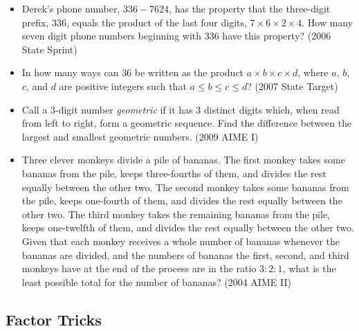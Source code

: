 \documentclass{article}
\begin{document}
\begin{itemize}
\item Derek's phone number, $336-7624$, has the property that the three-digit prefix, $336$, equals the product of the last four digits, $7\times 6\times 2\times 4$. How many seven digit phone numbers beginning with $336$ have this property? (2006 State Sprint)

\item In how many ways can $36$ be written as the product  $a\times b\times c\times d$, where $a$, $b$, $c$, and $d$ are positive integers such that $a\le b\le c\le d$? (2007 State Target)

\item Call a $3$-digit number \textit{geometric} if it has $3$ distinct digits which, when read from left to right, form a geometric sequence. Find the difference between the largest and smallest geometric numbers. (2009 AIME I)



\item Three clever monkeys divide a pile of bananas. The first monkey takes some bananas from the pile, keeps three-fourths of them, and divides the rest equally between the other two. The second monkey takes some bananas from the pile, keeps one-fourth of them, and divides the rest equally between the other two. The third monkey takes the remaining bananas from the pile, keeps one-twelfth of them, and divides the rest equally between the other two. Given that each monkey receives a whole number of bananas whenever the bananas are divided, and the numbers of bananas the first, second, and third monkeys have at the end of the process are in the ratio $3:2:1$, what is the least possible total for the number of bananas? (2004 AIME II)

\end{itemize}



\subsection{Factor Tricks}
\end{document}
